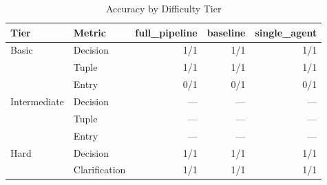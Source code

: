 \begin{table}[htbp]
\centering
\caption{Accuracy by Difficulty Tier}
\label{tab:tier-breakdown}
\begin{tabular}{ll rrr}
\toprule
Tier & Metric & full\_pipeline & baseline & single\_agent \\
\midrule
  Basic & Decision & 1/1 & 1/1 & 1/1 \\
   & Tuple & 1/1 & 1/1 & 1/1 \\
   & Entry & 0/1 & 0/1 & 0/1 \\
  \midrule
  Intermediate & Decision & --- & --- & --- \\
   & Tuple & --- & --- & --- \\
   & Entry & --- & --- & --- \\
  \midrule
  Hard & Decision & 1/1 & 1/1 & 1/1 \\
   & Clarification & 1/1 & 1/1 & 1/1 \\
\bottomrule
\end{tabular}
\end{table}
